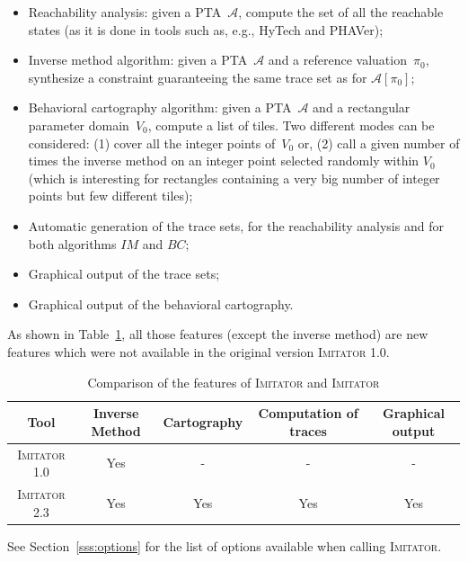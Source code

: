 \documentclass[a4paper,10pt]{article}
\newcommand{\A}{\mathcal{A}}
\newcommand{\IM}{\mathit{IM}}
\newcommand{\carto}{\mathit{BC}}
\newcommand{\hytech}{{\sc HyTech}}
\newcommand{\imitator}{\textsc{Imitator}}
\newcommand{\phaver}{PHAVer}
\newcommand{\imitatorversion}{2.3}
\begin{document}
\begin{itemize}
	\item Reachability analysis: given a PTA~$\A$, compute the set of all the reachable states (as it is done in tools such as, e.g., \hytech{} and \phaver{});
	\item Inverse method algorithm: given a PTA~$\A$ and a reference valuation~$\pi_0$, synthesize a constraint guaranteeing the same trace set as for $\A[\pi_0]$;
	\item Behavioral cartography algorithm: given a PTA~$\A$ and a rectangular parameter domain~$V_0$, compute a list of tiles. Two different modes can be considered: (1) cover all the integer points of~$V_0$ or, (2) call a given number of times the inverse method on an integer point selected randomly within $V_0$ (which is interesting for rectangles containing a very big number of integer points but few different tiles);
	\item Automatic generation of the trace sets, for the reachability analysis and for both algorithms $\IM$ and $\carto$;
	\item Graphical output of the trace sets;
        \item Graphical output of the behavioral cartography. 
\end{itemize}

As shown in Table~\ref{table:features}, all those features (except the inverse method) are new features which were not available in the original version \imitator{} 1.0.


\begin{table}[ht!]
{

\centering
\small

\begin{tabular}{| c || c | c | c | c |}
	\hline
	Tool & Inverse Method & Cartography & Computation of traces & Graphical output \\
	\hline
	\imitator{} 1.0 & Yes & - & - & - \\
	\hline
	\imitator{} \imitatorversion{} & Yes & Yes & Yes & Yes\\
	\hline
\end{tabular}

}
\caption{Comparison of the features of \imitator{} and \imitator{}}
\label{table:features}
\end{table}

See Section~\ref{sss:options} for the list of options available when calling \imitator{}.
\end{document}
